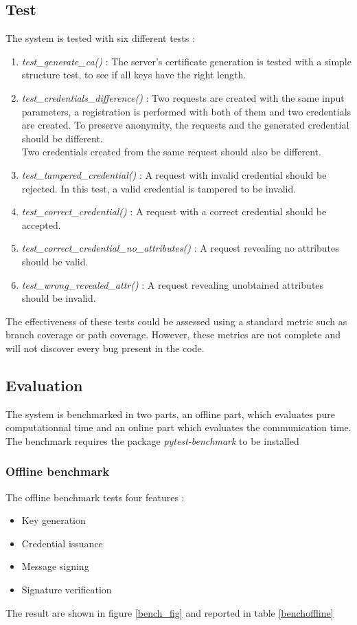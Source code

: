 \documentclass[10pt,conference,compsocconf]{IEEEtran}
\begin{document}
\subsection{Test}
The system is tested with six different tests : 
\begin{enumerate}
    \item \textit{test\_generate\_ca()} : The server's certificate generation is tested with a simple structure test, to see if all keys have the right length.
    \item \textit{test\_credentials\_difference()} : Two requests are created with the same input parameters, a registration is performed with both of them and two credentials are created. To preserve anonymity, the requests and the generated credential should be different. \\ Two credentials created from the same request should also be different.
    \item \textit{test\_tampered\_credential()} : A request with invalid credential should be rejected. In this test, a valid credential is tampered to be invalid.
    \item \textit{test\_correct\_credential()} : A request with a correct credential should be accepted.
    \item \textit{test\_correct\_credential\_no\_attributes()} : A request revealing no attributes should be valid.
    \item \textit{test\_wrong\_revealed\_attr()} : A request revealing unobtained attributes should be invalid.
\end{enumerate}
The effectiveness of these tests could be assessed using a standard metric such as branch coverage or path coverage. However, these metrics are not complete and will not discover every bug present in the code.

\subsection{Evaluation}
The system is benchmarked in two parts, an offline part, which evaluates pure computationnal time and an online part which evaluates the communication time. The benchmark requires the package \textit{pytest-benchmark} to be installed

\subsubsection{Offline benchmark}
The offline benchmark tests four features :
\begin{itemize}
    \item Key generation
    \item Credential issuance
    \item Message signing
    \item Signature verification
\end{itemize}
The result are shown in figure \ref{bench_fig}
and reported in table \ref{benchoffline}
\end{document}
